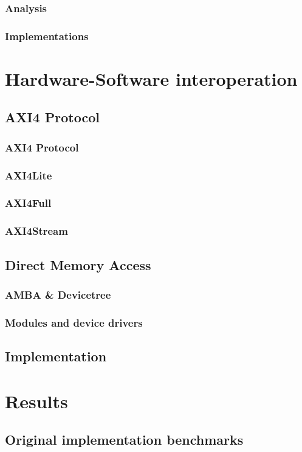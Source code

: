 \documentclass{iccmemoria}
\begin{document}
    \subsection{Analysis}
    \subsection{Implementations}
    
\chapter{Hardware-Software interoperation}
\section{AXI4 Protocol}
  \subsection{AXI4 Protocol}
  \subsection{AXI4Lite}
  \subsection{AXI4Full}
  \subsection{AXI4Stream}
\section{Direct Memory Access}
  \subsection{AMBA \& Devicetree}
  \subsection{Modules and device drivers}
\section{Implementation}

\chapter{Results}
\section{Original implementation benchmarks}
\end{document}

